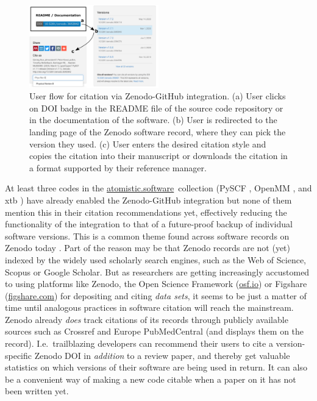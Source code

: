 \documentclass[9pt,review]{livecoms}
\newcommand{\atsoft}{\href{https://atomistic.software}{atomistic.software}\ }
\begin{document}
\begin{figure}
    \includegraphics[width=0.5\textwidth]{figures/zenodo-github}
    \caption{
        User flow for citation via Zenodo-GitHub integration.
        (a) User clicks on DOI badge in the README file of the source code repository or in the documentation of the software.
        (b) User is redirected to the landing page of the Zenodo software record, where they can pick the version they used.
        (c) User enters the desired citation style and copies the citation into their manuscript or downloads the citation in a format supported by their reference manager.
    }
    \label{fig:zenodo-github}
\end{figure}




At least three codes in the \atsoft collection (PySCF \cite{Sun2020a}, OpenMM \cite{Eastman2017}, and xtb \cite{Bannwarth2021}) have already enabled the Zenodo-GitHub integration but none of them mention this in their citation recommendations yet, effectively reducing the functionality of the integration to that of a future-proof backup of individual software versions.
This is a common theme found across software records on Zenodo today \cite{vandeSandt2019a}.
Part of the reason may be that Zenodo records are not (yet) indexed by the widely used scholarly search engines, such as the Web of Science, Scopus or Google Scholar.
But as researchers are getting increasingly accustomed to using platforms like Zenodo, the Open Science Framework (\href{https://osf.io}{osf.io}) or Figshare (\href{https://figshare.com}{figshare.com}) for depositing and citing \emph{data sets}, it seems to be just a matter of time until analogous practices in software citation will reach the mainstream.
Zenodo already \emph{does} track citations of its records through publicly available sources such as Crossref and Europe PubMedCentral (and displays them on the record). 
I.e.\ trailblazing developers can recommend their users to cite a version-specific Zenodo DOI in \emph{addition} to a review paper, and thereby get valuable statistics on which versions of their software are being used in return.
It can also be a convenient way of making a new code citable when a paper on it has not been written yet.
\end{document}
